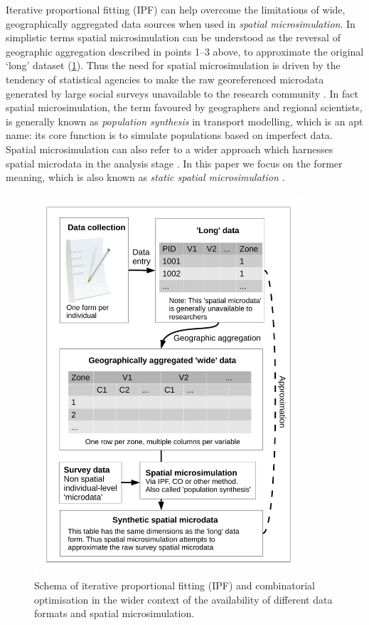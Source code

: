 \documentclass[a4paper,10pt]{article}
\begin{document}
Iterative proportional fitting (IPF) can help overcome the limitations of wide, geographically aggregated data
sources when used in
\emph{spatial microsimulation}. In simplistic terms spatial microsimulation can be understood
as the reversal of geographic aggregation described in points 1--3 above,
to approximate the original `long' dataset (\cref{fmsim-schema}).
Thus the need for spatial microsimulation is driven by
the tendency of statistical agencies to make the raw georeferenced microdata generated 
by large social surveys unavailable to the research community \citep{Lee2009}.
In fact spatial microsimulation, the term favoured by geographers and regional scientists, is
generally known as \emph{population synthesis} in transport modelling, which 
is an apt name: its core function is to simulate populations based on 
imperfect data. Spatial microsimulation can also refer to a wider approach which
harnesses spatial microdata in the analysis stage \citep{Holm1987, Lovelace2014-jtg}.
In this paper we focus on the former meaning, which is also known as \emph{static spatial microsimulation}
\citep{Ballas2005c}.

\begin{figure}
\begin{center}
  \includegraphics[width=10cm]{msim-schema}
\end{center}

\caption{Schema of iterative proportional fitting (IPF) and combinatorial optimisation
in the wider context of the availability of different data formats and spatial microsimulation. \label{fmsim-schema}}
\end{figure}
\end{document}
